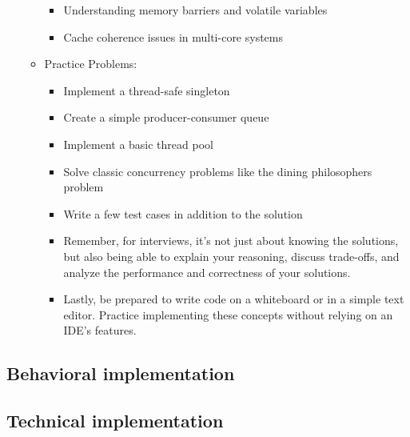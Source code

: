\documentclass{article}
\begin{document}
\begin{itemize}
\begin{itemize}
				\begin{itemize}
					\item Understanding memory barriers and volatile variables
					\item Cache coherence issues in multi-core systems
				\end{itemize}
\item Practice Problems:
	\begin{itemize}
		\item Implement a thread-safe singleton
		\item Create a simple producer-consumer queue
		\item Implement a basic thread pool
		\item Solve classic concurrency problems like the dining philosophers problem
		\item Write a few test cases in addition to the solution
		\item Remember, for interviews, it's not just about knowing the solutions, but also being able to explain your reasoning, discuss trade-offs, and analyze the performance and correctness of your solutions.
		\item Lastly, be prepared to write code on a whiteboard or in a simple text editor. Practice implementing these concepts without relying on an IDE's features.
	\end{itemize}
\end{itemize}
\end{itemize}

\subsection{Behavioral implementation}
\subsection{Technical implementation}
\end{document}
